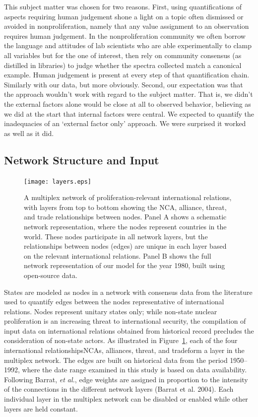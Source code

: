 \documentclass{article} %
\begin{document}
{This subject matter was chosen for two reasons. First, using quantifications of aspects requiring human judgement shone a light on a topic often dismissed or avoided in nonproliferation, namely that any value assignment to an observation requires human judgement. In the nonproliferation community we often borrow the language and attitudes of lab scientists who are able experimentally to clamp all variables but for the one of interest, then rely on community consensus (as distilled in libraries) to judge whether the spectra collected match a canonical example. Human judgement is present at every step of that quantification chain. Similarly with our data, but more obviously. Second, our expectation was that the approach wouldn't work with regard to the subject matter. That is, we didn't the external factors alone would be close at all to observed behavior, believing as we did at the start that internal factors were central. We expected to quantify the inadequacies of an `external factor only' approach. We were surprised it worked as well as it did.


\subsection{Network Structure and Input}

\begin{figure}
\begin{center}
\texttt{[image: layers.eps]}
\caption{A multiplex network of proliferation-relevant international relations, with layers from top to bottom showing the NCA, alliance, threat, and trade relationships between nodes. Panel A shows a schematic network representation, where the nodes represent countries in the world. These nodes participate in all network layers, but the relationships between nodes (edges) are unique in each layer based on the relevant international relations. Panel B shows the full network representation of our model for the year 1980, built using open-source data.} 
\label{layers}
\end{center} 
\end{figure}

States are modeled as nodes in a network with consensus data from the literature used to quantify edges between the nodes representative of international relations. Nodes represent unitary states only; while non-state nuclear proliferation is an increasing threat to international security, the compilation of input data on international relations obtained from historical record precludes the consideration of non-state actors. As illustrated in Figure~\ref{layers}, each of the four international relationships\textemdash NCAs, alliances, threat, and trade\textemdash form a layer in the multiplex network. The edges are built on historical data from the period 1950--1992, where the date range examined in this study is based on data availability. Following Barrat, \textit{et al.}, edge weights are assigned in proportion to the intensity of the connections in the different network layers (Barrat et al. 2004). Each individual layer in the multiplex network can be disabled or enabled while other layers are held constant.

}
\end{document}
